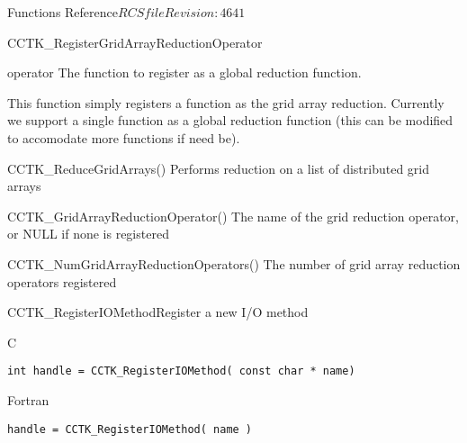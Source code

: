 \begin{cactuspart}{ Functions Reference}{$RCSfile$}{$Revision: 4641 $}
\begin{FunctionDescription}{CCTK\_RegisterGridArrayReductionOperator}
\begin{ParameterSection}
\begin{Parameter}{operator}
The function to register as a global reduction function.
\end{Parameter}
\end{ParameterSection}

\begin{Discussion}
This function simply registers a function as the grid array reduction. Currently
we support a single function as a global reduction function (this can be
modified to accomodate more functions if need be).
\end{Discussion}

\begin{SeeAlsoSection}
\begin{SeeAlso}{CCTK\_ReduceGridArrays()}
Performs reduction on a list of distributed grid arrays
\end{SeeAlso}

\begin{SeeAlso}{CCTK\_GridArrayReductionOperator()}
The name of the grid reduction operator, or NULL if none is registered
\end{SeeAlso}

\begin{SeeAlso}{CCTK\_NumGridArrayReductionOperators()}
The number of grid array reduction operators registered
\end{SeeAlso}
\end{SeeAlsoSection}
\end{FunctionDescription}

\begin{FunctionDescription}{CCTK\_RegisterIOMethod}{Register a new I/O method}
\label{CCTK-RegisterIOMethod}
\begin{SynopsisSection}
\begin{Synopsis}{C}
\begin{verbatim}int handle = CCTK_RegisterIOMethod( const char * name)\end{verbatim}
\end{Synopsis}
\begin{Synopsis}{Fortran}
\begin{verbatim}handle = CCTK_RegisterIOMethod( name )


\end{verbatim}
\end{Synopsis}
\end{SynopsisSection}
\end{FunctionDescription}
\end{cactuspart}
